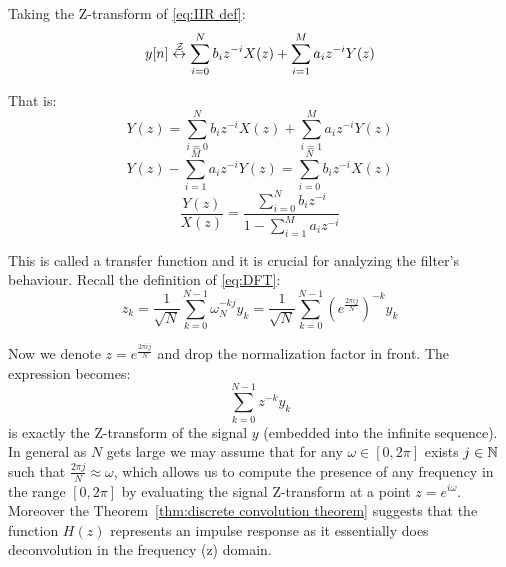 Taking the Z-transform of \eqref{eq:IIR def}:
\[
    y[n] \overset{\mathcal{Z}}{\leftrightarrow} \sum_{i=0}^{N} b_i z^{-i} X(z) + \sum_{i=1}^{M} a_i z^{-i} Y(z)\]

That is:
\[Y(z) = \sum_{i=0}^{N} b_i z^{-i} X(z) + \sum_{i=1}^{M} a_i z^{-i} Y(z)\]
\[Y(z) - \sum_{i=1}^{M} a_i z^{-i} Y(z) = \sum_{i=0}^{N} b_i z^{-i} X(z)\]
\begin{equation}
    \frac{Y(z)}{X(z)} = \frac{\sum_{i=0}^{N} b_i z^{-i}}{1 - \sum_{i=1}^{M} a_i z^{-i}}
    \label{eq:transfer func}
\end{equation}

This is called a transfer function and it is crucial for analyzing the filter's behaviour. Recall the definition of \ref{eq:DFT}:
\[z_k
    = \frac{1}{\sqrt{N}}\sum_{k =0}^{N-1} \omega_N^{-kj} y_k
    = \frac{1}{\sqrt{N}}\sum_{k =0}^{N-1} {\left(e^{\frac{2\pi i j}{N}}\right)}^{-k} y_k\]

Now we denote $z = e^{\frac{2\pi i j}{N}}$ and drop the normalization factor in front. The expression becomes:
\[\sum_{k =0}^{N-1} z^{-k} y_k\]
is exactly the Z-transform of the signal $y$ (embedded into the infinite sequence). In general as $N$ gets large we may assume that for any $\omega \in [0, 2\pi]$ exists $j\in \mathbb{N}$ such that $\frac{2\pi j}{N} \approx \omega$, which allows us to compute the presence of any frequency in the range $[0, 2\pi]$ by evaluating the signal Z-transform at a point $z = e^{i\omega}$. Moreover the Theorem~\ref{thm:discrete convolution theorem} suggests that the function $H(z)$ represents an impulse response as it essentially does deconvolution in the frequency (z) domain.

